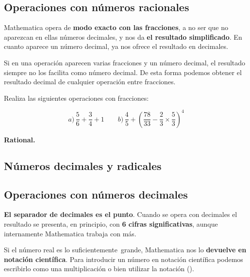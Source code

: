 \documentclass[a4paper,10pt, draft]{article}
\newcommand{\com}[1]{\textbf{\color{blue}{#1}}}
\newenvironment{capitulo}{\begin{tcolorbox}[colback=red!5!white,colframe=red!75!black]}{\end{tcolorbox}\bigskip}
\newenvironment{ejer}{\begin{tcolorbox}[center title, title=Ejercicios,
fonttitle=\sffamily\bfseries,colback=blue!5,colframe=orange]}{\end{tcolorbox}}
\newenvironment{funciones}{\begin{tcolorbox}[center title, title=Nuevas funciones, fonttitle=\sffamily\bfseries, colback=green!5!white,colframe=red!75!black]}{\end{tcolorbox}\bigskip}
\begin{document}
\newpage

\subsection{Operaciones con números racionales}

Mathematica opera de \textbf{modo exacto con las fracciones},  a no ser que no aparezcan en ellas números decimales, y nos da \textbf{el resultado simplificado}. En cuanto aparece un número decimal, ya nos ofrece el resultado en decimales. 

Si en una operación aparecen varias fracciones y un número decimal, el resultado siempre no los facilita como número decimal. De esta forma podemos obtener el resultado decimal de cualquier operación entre fracciones.


\begin{ejer}

Realiza las siguientes operaciones con fracciones:

$$
a)\,\frac{5}{6}+\frac{3}{4} +1 \qquad b)\,\frac{4}{5}+\left(\frac{78}{33}-\frac{2}{3}\times \frac{5}{3}\right)^4
$$


\end{ejer}


\begin{funciones}

\textbf{Rational.}


\end{funciones}

\newpage


\begin{capitulo}

\section{Números decimales y radicales}

\end{capitulo}

\subsection{Operaciones con números decimales} 
 
 \textbf{El separador de decimales es el punto}.  Cuando se opera con decimales  el resultado se presenta, en principio, con \textbf{6 cifras significativas}, aunque internamente Mathematica trabaja con más. 

Si el número real es lo \guillemotleft suficientemente\guillemotright\  grande, Mathematica nos lo \textbf{devuelve en notación científica}. Para introducir un número en notación científica podemos escribirlo como  una multiplicación o bien utilizar la  notación (\com{ *\^{} }).
\end{document}
